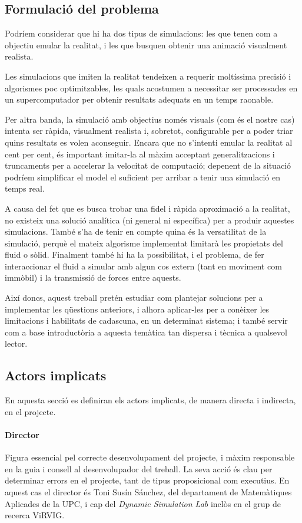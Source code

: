 \documentclass[a4paper]{article} %
\begin{document}
	
	\subsection{Formulació del problema}
	Podríem considerar que hi ha dos tipus de simulacions: les que tenen com a objectiu emular la realitat, i les que busquen obtenir una animació visualment realista.\par
	Les simulacions que imiten la realitat tendeixen a requerir moltíssima precisió i algorismes poc optimitzables, les quals acostumen a necessitar ser processades en un supercomputador per obtenir resultats adequats en un temps raonable. \par
	Per altra banda, la simulació amb objectius només visuals (com és el nostre cas) intenta ser ràpida, visualment realista i, sobretot, configurable per a poder triar quins resultats es volen aconseguir. Encara que no s'intenti emular la realitat al cent per cent, és important imitar-la al màxim acceptant generalitzacions i truncaments per a accelerar la velocitat de computació; depenent de la situació podríem simplificar el model el suficient per arribar a tenir una simulació en temps real.\par
	A causa del fet que es busca trobar una fidel i ràpida aproximació a la realitat, no existeix una solució analítica (ni general ni específica) per a produir aquestes simulacions. També s'ha de tenir en compte quina és la versatilitat de la simulació, perquè el mateix algorisme implementat limitarà les propietats del fluid o sòlid. Finalment també hi ha la possibilitat, i el problema, de fer interaccionar el fluid a simular amb algun cos extern (tant en moviment com immòbil) i la transmissió de forces entre aquests. \par
	Així doncs, aquest treball pretén estudiar com plantejar solucions per a implementar les qüestions anteriors, i alhora aplicar-les per a conèixer les limitacions i habilitats de cadascuna, en un determinat sistema; i també servir com a base introductòria a aquesta temàtica tan dispersa i tècnica a qualsevol lector.
	
	\subsection{Actors implicats}
	En aquesta secció es definiran els actors implicats, de manera directa i indirecta, en el projecte.
	\paragraph{\quad Director} Figura essencial pel correcte desenvolupament del projecte, i màxim responsable en la guia i consell al desenvolupador del treball. La seva acció és clau per determinar errors en el projecte, tant de tipus proposicional com executius. En aquest cas el director és Toni Susín Sánchez, del departament de Matemàtiques Aplicades de la UPC, i cap del \textit{Dynamic Simulation Lab} inclòs en el grup de recerca ViRVIG.
\end{document}
